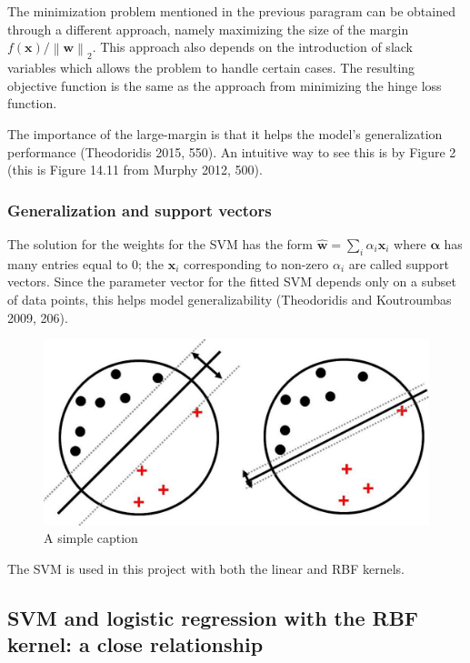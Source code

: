 \documentclass[letterpaper, 11pt]{article}
\newcommand{\norm}[1]{\left\lVert #1 \right\rVert}
\newcommand{\vect}[1]{\boldsymbol{#1}}
\begin{document}
The minimization problem mentioned in the previous paragram can be obtained through a different approach, namely maximizing the size of the margin $f(\vect{x}) / \norm{\vect{w}}_2$. This approach also depends on the introduction of slack variables which allows the problem to handle certain cases. The resulting objective function is the same as the approach from minimizing the hinge loss function.

The importance of the large-margin is that it helps the model's generalization performance (Theodoridis 2015, 550). An intuitive way to see this is by Figure 2 (this is Figure 14.11 from Murphy 2012, 500).

\subsubsection{Generalization and support vectors}

The solution for the weights for the SVM has the form $\widehat{\vect{w}} = \sum_i \alpha_i \vect{x}_i$ where $\vect{\alpha}$ has many entries equal to 0; the $\vect{x}_i$ corresponding to non-zero $\alpha_i$ are called support vectors. Since the parameter vector for the fitted SVM depends only on a subset of data points, this helps model generalizability (Theodoridis and Koutroumbas 2009, 206).

\begin{figure}[ht!]
\centering
\includegraphics[width=120mm]{largeMarginPrinciple2.jpg}
\caption{A simple caption \label{overflow}}
\end{figure}

The SVM is used in this project with both the linear and RBF kernels.

\subsection{SVM and logistic regression with the RBF kernel: a close relationship}
\end{document}
